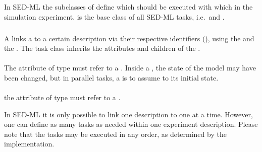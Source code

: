 \subsection{}
\label{class:abstractTask}
In SED-ML the subclasses of  define which \Simulations should be executed with which \Models in the simulation experiment.  is the base class of all SED-ML tasks, i.e.\ \Task and \RepeatedTask.  



\subsubsection{}
\label{class:task}

A  links a \Model to a certain \Simulation description via their respective identifiers (), using the \hyperref[sec:modelReference]{} and the \hyperref[sec:simulationReference]{}. The task class inherits the attributes and children of the \AbstractTask.

\paragraph*{}
The  attribute of type \SIdRef must refer to a \Model.  Inside a \RepeatedTask, the state of the model may have been changed, but in parallel tasks, a \Model is to assume to its initial state.

\paragraph*{}
the  attribute of type \SIdRef must refer to a \Simulation.

In SED-ML it is only possible to link one \Simulation description to one \Model at a time. However, one can define as many tasks as needed within one experiment description. Please note that the tasks may be executed in any order, as determined by the implementation.


